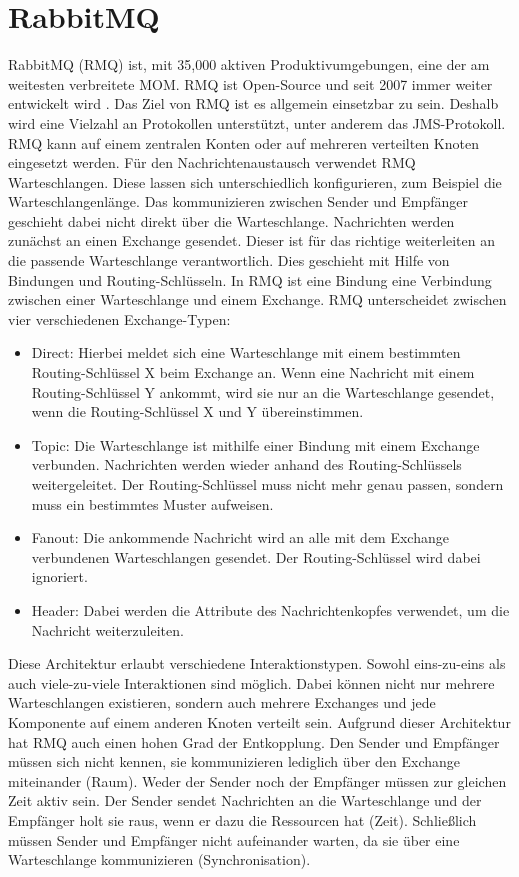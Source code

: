 \section{RabbitMQ}
\label{sec:rmq}
RabbitMQ (RMQ) ist, mit 35,000 aktiven Produktivumgebungen, eine der am weitesten verbreitete MOM. 
RMQ ist Open-Source und seit 2007 immer weiter entwickelt wird \cite{rabbitmq}. Das Ziel von RMQ ist es allgemein einsetzbar zu sein. Deshalb wird eine Vielzahl an Protokollen unterstützt, unter anderem das JMS-Protokoll. RMQ kann auf einem zentralen Konten oder auf mehreren verteilten Knoten eingesetzt werden. Für den Nachrichtenaustausch verwendet RMQ Warteschlangen. Diese lassen sich unterschiedlich konfigurieren, zum Beispiel die Warteschlangenlänge. Das kommunizieren zwischen Sender und Empfänger geschieht dabei nicht direkt über die Warteschlange. Nachrichten werden zunächst an einen Exchange gesendet. Dieser ist für das richtige weiterleiten an die passende Warteschlange verantwortlich. Dies geschieht mit Hilfe von Bindungen und Routing-Schlüsseln. In RMQ ist eine Bindung eine Verbindung zwischen einer Warteschlange und einem Exchange. RMQ unterscheidet zwischen vier verschiedenen Exchange-Typen:
\begin{itemize}
    \item Direct: Hierbei meldet sich eine Warteschlange mit einem bestimmten Routing-Schlüssel X beim Exchange an. Wenn eine Nachricht mit einem Routing-Schlüssel Y ankommt, wird sie nur an die Warteschlange gesendet, wenn die Routing-Schlüssel X und Y übereinstimmen.
    \item Topic: Die Warteschlange ist mithilfe einer Bindung mit einem Exchange verbunden. Nachrichten werden wieder anhand des Routing-Schlüssels weitergeleitet. Der Routing-Schlüssel muss nicht mehr genau passen, sondern muss ein bestimmtes Muster aufweisen.
    \item Fanout: Die ankommende Nachricht wird an alle mit dem Exchange verbundenen Warteschlangen gesendet. Der Routing-Schlüssel wird dabei ignoriert.
    \item Header: Dabei werden die Attribute des Nachrichtenkopfes verwendet, um die Nachricht weiterzuleiten.
\end{itemize}
Diese Architektur erlaubt verschiedene Interaktionstypen. Sowohl eins-zu-eins als auch viele-zu-viele Interaktionen sind möglich. Dabei können nicht nur mehrere Warteschlangen existieren, sondern auch mehrere Exchanges und jede Komponente auf einem anderen Knoten verteilt sein. Aufgrund dieser Architektur hat RMQ auch einen hohen Grad der Entkopplung. Den Sender und Empfänger müssen sich nicht kennen, sie kommunizieren lediglich über den Exchange miteinander (Raum). Weder der Sender noch der Empfänger müssen zur gleichen Zeit aktiv sein. Der Sender sendet Nachrichten an die Warteschlange und der Empfänger holt sie raus, wenn er dazu die Ressourcen hat (Zeit). Schließlich müssen Sender und Empfänger nicht aufeinander warten, da sie über eine Warteschlange kommunizieren (Synchronisation).
